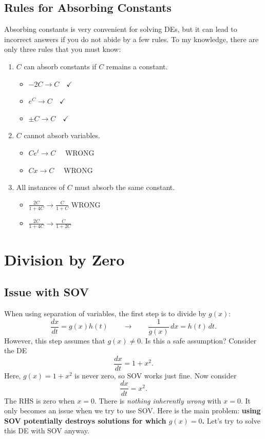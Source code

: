 \documentclass[10pt,letterpaper]{article}
\begin{document}
\subsection{Rules for Absorbing Constants}
Absorbing constants is very convenient for solving DEs, but it can lead to incorrect answers if you do not abide by a few rules. To my knowledge, there are only three rules that you must know:\\[1mm] 
\begin{enumerate}
    \item $C$ can absorb constants if $C$ remains a constant.
    \begin{itemize}
        \item $-2C \rightarrow C \quad \checkmark$ 
        \item $e^C \rightarrow  C \quad \checkmark$
        \item $\pm C \to C \quad \checkmark $
    \end{itemize}
    \item $C$ cannot absorb variables. 
    \begin{itemize}
        \item $Ce^t \to C \quad $ WRONG 
        \item $Cx\to C\quad$ WRONG 
    \end{itemize}
    \item All instances of $C$ must absorb the same constant.
    \begin{itemize}
        \item $\frac{2C}{1+4C} \to \frac{C}{1+C}$ \quad WRONG
        \item $\frac{2C}{1+4C} \to \frac{C}{1+2C}$ \quad \checkmark
    \end{itemize}
\end{enumerate}

\section{Division by Zero}

\subsection{Issue with SOV}
When using separation of variables, the first step is to divide by $g(x)$:
\[
\frac{dx}{dt}=g(x)h(t)
\qquad\longrightarrow\qquad
\frac{1}{g(x)}\,dx=h(t)\,dt.
\]
However, this step assumes that $g(x)\neq 0$. Is this a safe assumption? Consider the DE
$$
\frac{dx}{dt} = 1+x^2.
$$
Here, $g(x)=1+x^2$ is never zero, so SOV works just fine. Now consider
$$
\frac{dx}{dt} = x^2.
$$
The RHS is zero when $x=0$. There is \textit{nothing inherently wrong} with $x=0$. It only becomes an issue when we try to use SOV. Here is the main problem: \textbf{using SOV potentially destroys solutions for which $g(x)=0$.} Let's try to solve this DE with SOV anyway.
\end{document}

